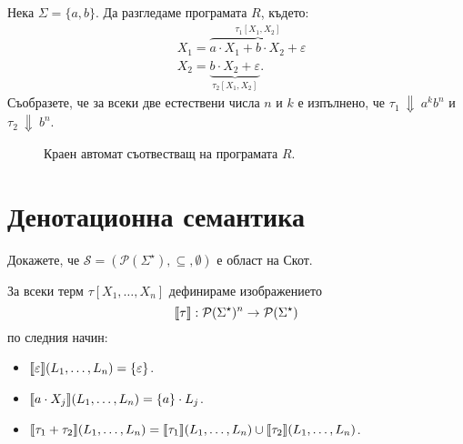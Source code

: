 \begin{example}
  Нека $\Sigma = \{a,b\}$. Да разгледаме програмата $R$, където:
  \begin{align*}
    & X_1 = \overbrace{a \cdot X_1 + b \cdot X_2 + \varepsilon}^{\tau_1[X_1,X_2]}\\
    & X_2 = \underbrace{b \cdot X_2 + \varepsilon}_{\tau_2[X_1,X_2]}.    
  \end{align*}
  Съобразете, че за всеки две естествени числа $n$ и $k$ е изпълнено, че $\tau_1~\Downarrow~a^k b^n$ и $\tau_2~\Downarrow~b^n$.
  \begin{figure}[H]
      \centering
      \caption{Краен автомат съотвестващ на програмата $R$.}
    \end{figure}
\end{example}

\section{Денотационна семантика}
\label{reg:sect:denotational-semantics}


\begin{problem}
  Докажете, че $\mathcal{S} = (\mathcal{P}(\Sigma^\star), \subseteq, \emptyset)$ е област на Скот.
\end{problem}

За всеки терм $\tau[X_1,\dots,X_n]$ дефинираме изображението
\[\llbracket{\tau}\rrbracket: \mathcal{P}(\Sigma^\star)^n \to \mathcal{P}(\Sigma^\star)\]
 по следния начин:
\begin{itemize}
\item 
  $\llbracket{\varepsilon}\rrbracket(L_1,\dots,L_n) = \{\varepsilon\}$.
\item 
  $\llbracket{a \cdot X_j}\rrbracket(L_1,\dots,L_n) = \{a\} \cdot L_j$.
\item
  $\llbracket{\tau_1 + \tau_2}\rrbracket(L_1,\dots,L_n) = \llbracket{\tau_1}\rrbracket(L_1,\dots,L_n) \cup \llbracket{\tau_2}\rrbracket(L_1,\dots,L_n)$.
\end{itemize}

